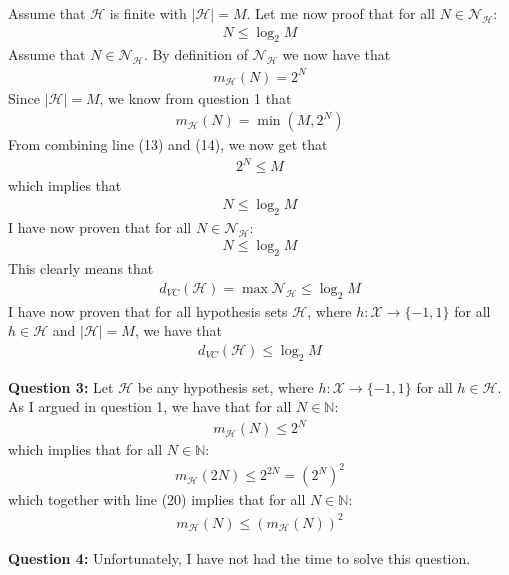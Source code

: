 Assume that $\mathcal{H}$ is finite with $|\mathcal{H}|=M$. Let me now proof that for all $N \in \mathcal{N}_\mathcal{H}$:
\begin{align}
N \leq \log_2 M
\end{align}
Assume that $N \in \mathcal{N}_\mathcal{H}$. By definition of $\mathcal{N}_\mathcal{H}$ we now have that
\begin{align}
m_\mathcal{H}(N)=2^N 
\end{align}
Since $|\mathcal{H}|=M$, we know from question 1 that
\begin{align}
m_\mathcal{H}(N)=\min(M, 2^N) 
\end{align}
From combining line (13) and (14), we now get that
\begin{align}
2^N \leq M 
\end{align}
which implies that
\begin{align}
N \leq \log_2M
\end{align}
I have now proven that for all $N \in \mathcal{N}_\mathcal{H}$:
\begin{align}
N \leq \log_2 M
\end{align}
This clearly means that 
\begin{align}
d_{VC}(\mathcal{H}) = \max \mathcal{N}_\mathcal{H} \leq \log_2 M
\end{align}
I have now proven that for all hypothesis sets $\mathcal{H}$, where $h:\mathcal{X}\to \{-1,1\}$ for all $h\in \mathcal{H}$ and $|\mathcal{H}|=M$, we have that
\begin{align}
d_{VC}(\mathcal{H}) \leq \log_2 M
\end{align}

\textbf{Question 3:} Let $\mathcal{H}$ be any hypothesis set, where $h:\mathcal{X}\to \{-1,1\}$ for all $h\in \mathcal{H}$. As I argued in question 1, we have that for all $N \in \mathbb{N}$:
\begin{align}
m_\mathcal{H}(N) \leq 2^N
\end{align}
which implies that for all $N \in \mathbb{N}$:
\begin{align}
m_\mathcal{H}(2N) \leq 2^{2N} = \left(2^N\right)^2
\end{align}
which together with line (20) implies that for all $N \in \mathbb{N}$:
\begin{align}
m_\mathcal{H}(N) \leq \left( m_\mathcal{H}(N) \right)^2
\end{align}

\textbf{Question 4:} Unfortunately, I have not had the time to solve this question.